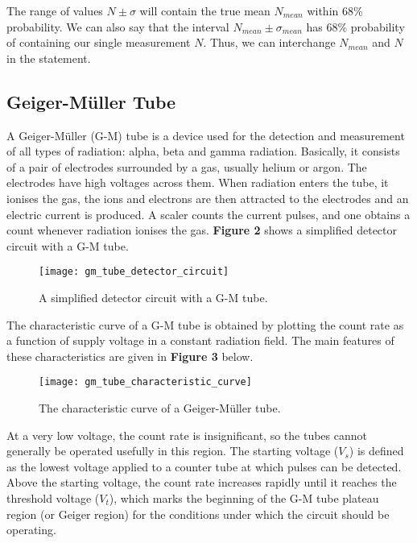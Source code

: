 \documentclass[a4paper,11pt]{article}
\begin{document}
The range of values $N \pm \sigma$ will contain the true mean $N_{mean}$ within 68\% probability. We can also say that the interval $N_{mean} \pm \sigma_{mean}$ has 68\% probability of containing our single measurement $N$. Thus, we can interchange $N_{mean}$ and $N$ in the statement.

\subsection*{Geiger-Müller Tube}
A Geiger-Müller (G-M) tube is a device used for the detection and measurement of all types of radiation: alpha, beta and gamma radiation. Basically, it consists of a pair of electrodes surrounded by a gas, usually helium or argon. The electrodes have high voltages across them. When radiation enters the tube, it ionises the gas, the ions and electrons are then attracted to the electrodes and an electric current is produced. A scaler counts the current pulses, and one obtains a count whenever radiation ionises the gas. \textbf{Figure 2} shows a simplified detector circuit with a G-M tube.

\begin{figure}[h]
    \centering
    \texttt{[image: gm\_tube\_detector\_circuit]}
    \caption{A simplified detector circuit with a G-M tube.}
    \label{fig:gm_tube}
\end{figure}

The characteristic curve of a G-M tube is obtained by plotting the count rate as a function of supply voltage in a constant radiation field. The main features of these characteristics are given in \textbf{Figure 3} below.

\begin{figure}[h]
    \centering
    \texttt{[image: gm\_tube\_characteristic\_curve]}
    \caption{The characteristic curve of a Geiger-Müller tube.}
    \label{fig:gm_characteristic}
\end{figure}

At a very low voltage, the count rate is insignificant, so the tubes cannot generally be operated usefully in this region. The starting voltage ($V_s$) is defined as the lowest voltage applied to a counter tube at which pulses can be detected. Above the starting voltage, the count rate increases rapidly until it reaches the threshold voltage ($V_t$), which marks the beginning of the G-M tube plateau region (or Geiger region) for the conditions under which the circuit should be operating.\\
\end{document}
